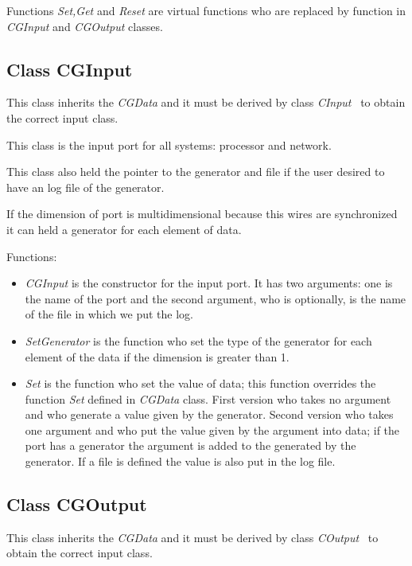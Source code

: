 \documentclass[a4paper,oneside,notitlepage]{article}
\begin{document}
Functions \textit{Set,Get} and \textit{Reset} are virtual functions who are
replaced by function in \textit{CGInput} and \textit{CGOutput} classes.

\subsection{Class CGInput}

This class inherits the \textit{CGData} and it must be derived by class 
\textit{CInput} \ to obtain the correct input class.

This class is the input port for all systems: processor and network.

This class also held the pointer to the generator and file if the user
desired to have an log file of the generator.

If the dimension of port is multidimensional because this wires are
synchronized it can held a generator for each element of data.

Functions:

\begin{itemize}
\item \textit{CGInput} is the constructor for the input port. It has two
arguments: one is the name of the port and the second argument, who is
optionally, is the name of the file in which we put the log.

\item \textit{SetGenerator} is the function who set the type of the
generator for each element of the data if the dimension is greater than 1.

\item \textit{Set} is the function who set the value of data; this function
overrides the function \textit{Set} defined in \textit{CGData} class. First
version who takes no argument and who generate a value given by the
generator. Second version who takes one argument and who put the value given
by the argument into data; if the port has a generator the argument is added
to the generated by the generator. If a file is defined the value is also
put in the log file.
\end{itemize}

\subsection{Class CGOutput}

This class inherits the \textit{CGData} and it must be derived by class 
\textit{COutput} \ to obtain the correct input class.
\end{document}
